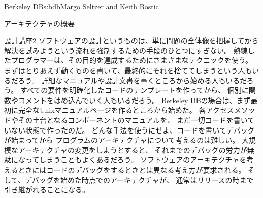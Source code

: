 \begin{aosachapter}{Berkeley DB}{s:bdb}{Margo Seltzer and Keith Bostic}
\begin{aosasect1}{アーキテクチャの概要}
\begin{aosabox}{設計講座2}
ソフトウェアの設計というものは、単に問題の全体像を把握してから
解決を試みようという流れを強制するための手段のひとつにすぎない。
熟練したプログラマーは、その目的を達成するためにさまざまなテクニックを使う。
まずはとりあえず動くものを書いて、最終的にそれを捨ててしまうという人もいるだろう。
詳細なマニュアルや設計文書を書くところから始める人もいるだろう。
すべての要件を明確化したコードのテンプレートを作ってから、
個別に関数やコメントをはめ込んでいく人もいるだろう。
Berkeley DBの場合は、まず最初に完全なUnixマニュアルページを作るところから始めた。
各アクセスメソッドやその土台となるコンポーネントのマニュアルを、
まだ一切コードを書いていない状態で作ったのだ。
どんな手法を使うにせよ、コードを書いてデバッグが始まってから
プログラムのアーキテクチャについて考えるのは難しい。
大規模なアーキテクチャの変更をしようとすると、
それまでのデバッグの労力が無駄になってしまうこともよくあるだろう。
ソフトウェアのアーキテクチャを考えるときにはコードのデバッグをするときとは異なる考え方が要求される。
そして、デバッグを始めた時点でのアーキテクチャが、
通常はリリースの時まで引き継がれることになる。

\end{aosabox}



\end{aosasect1}
\end{aosachapter}
